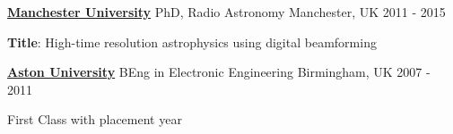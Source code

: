 \begin{cventries}
  \cventry
  	{\href{http://www.jodrellbank.manchester.ac.uk/}{\textbf{Manchester University}}}
    {PhD, Radio Astronomy}
    {Manchester, UK}
    {2011 - 2015}
    {
      \begin{cvitems}
        \item{\textbf{Title}: High-time resolution astrophysics using digital beamforming}
      \end{cvitems}
    }
	\cventry
	{\href{http://www.aston.ac.uk/eas/}{\textbf{Aston University}}}
	{BEng in Electronic Engineering}
	{Birmingham, UK}
	{2007 - 2011}
	{
		\begin{cvitems}
			\item{First Class with placement year}
		\end{cvitems}
	}
\end{cventries}
